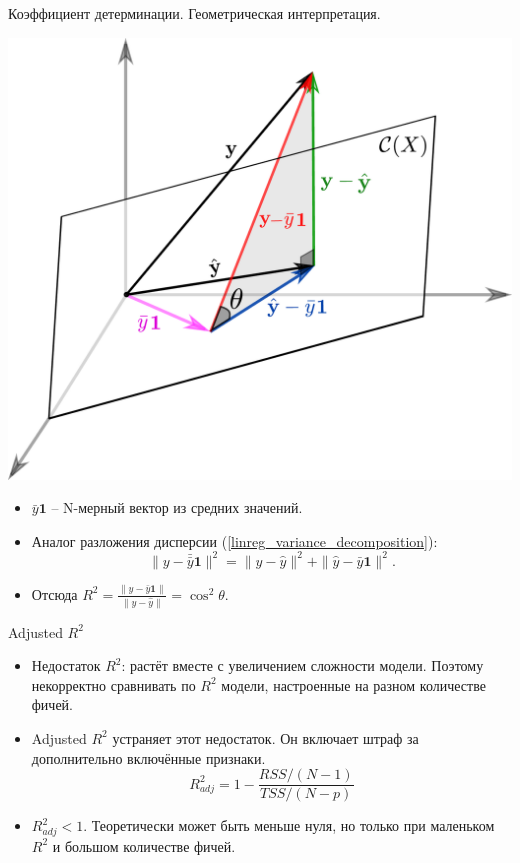 \documentclass[9pt]{beamer}
\begin{document}
\begin{frame}{Коэффициент детерминации. Геометрическая интерпретация.}
\begin{center}
    \includegraphics[height=0.5\textheight]{img/linear_regression_determination_coefficient.png}
\end{center}
\begin{itemize}
    \item $\bar y\textbf{1}$ -- N-мерный вектор из средних значений.
    \item Аналог разложения дисперсии (\ref{linreg_variance_decomposition}):
    $$\|y-\bar \bar y\textbf{1}\|^2 = \|y-\hat y\|^2 + \|\hat y - \bar y\textbf{1}\|^2.$$
    \item Отсюда $R^2 = \frac{\|\hat y - \bar y\textbf{1}\|}{\|y-\hat y\|} = \cos^2\theta$.
\end{itemize}
\end{frame}

\begin{frame}{Adjusted $R^2$}
    \begin{itemize}
        \item Недостаток $R^2$: растёт вместе с увеличением сложности модели. Поэтому некорректно сравнивать по $R^2$ модели, настроенные на разном количестве фичей.
        \item Adjusted $R^2$ устраняет этот недостаток. Он включает штраф за дополнительно включённые признаки.
        $$R^2_{adj} = 1 - \frac{RSS/(N-1)}{TSS/(N-p)}$$
        \item $R^2_{adj} < 1$. Теоретически может быть меньше нуля, но только при маленьком $R^2$ и большом количестве фичей.
    \end{itemize}
\end{frame}
\end{document}
